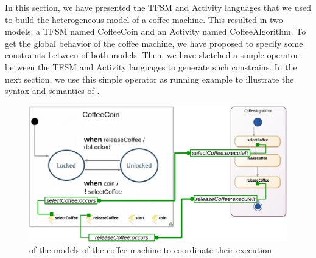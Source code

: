 In this section, we have presented the TFSM and Activity languages that we used to build the heterogeneous model of a coffee machine. This resulted in two models: a TFSM named CoffeeCoin and an Activity named CoffeeAlgorithm. To get the global behavior of the coffee machine, we have proposed to specify some constraints between \mse of both models. Then, we have sketched a simple \bcool operator between the TFSM and Activity languages to generate such constrains. In the next section, we use this simple operator as running example to illustrate the syntax and semantics of \bcool. 

  
	\begin{figure}[h]
		\begin{center}
			\includegraphics[width=1\textwidth]{bcool/figs/tfsmandadcoord}
			\caption{\mse of the models of the coffee machine to coordinate their execution}
			\label{fig:tfsmandadcoord}
		\end{center}
	\end{figure}

